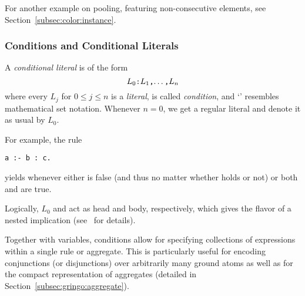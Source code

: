 For another example on pooling, featuring non-consecutive elements, see Section~\ref{subsec:color:instance}.

\subsubsection{Conditions and Conditional Literals}\label{subsec:gringo:condition}
%
%
%
A \emph{conditional literal} is of the form
\[\texttt{$L_0$:$L_1$,$\dots$,$L_n$}\]
%
where every $L_j$ for $0\leq j\leq n$ is a \emph{literal},
 is called \textit{condition},
and `\code{:}' resembles mathematical set notation.
Whenever $n=0$, we get a regular literal and denote it as usual by $L_0$.

For example, the rule
\begin{lstlisting}[numbers=none]
a :- b : c.
\end{lstlisting}
yields  whenever either  is false (and thus no matter whether  holds or not) or both  and  are true.

\begin{note}
Logically, $L_0$ and  act as
head and body, respectively,
which gives  
the flavor of a nested implication
(see~\cite{haliya14a} for details).
\end{note}

Together with variables,
conditions allow for specifying collections of expressions within a single rule or aggregate.
This is particularly useful for encoding conjunctions (or disjunctions) over
arbitrarily many ground atoms as well as for the compact representation of aggregates
(detailed in Section~\ref{subsec:gringo:aggregate}).

